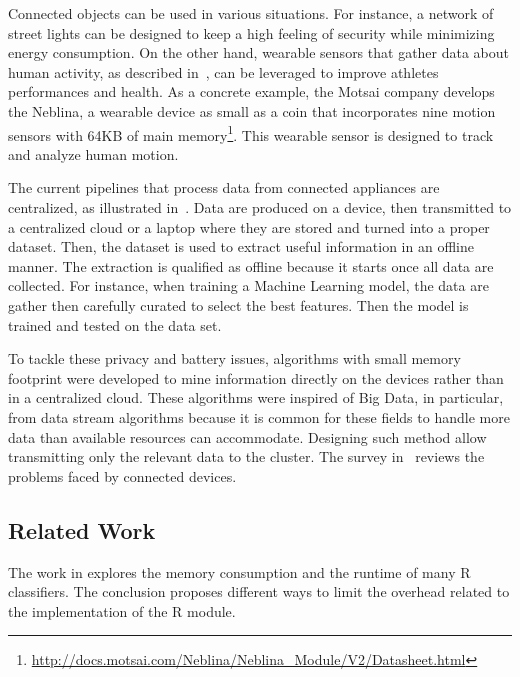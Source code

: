 Connected objects can be used in various
situations.  For instance, a network of street
lights can be designed to keep a high feeling of
security while minimizing energy consumption.  On
the other hand, wearable sensors that gather data
about human activity, as described
in~\cite{recofit}, can be leveraged to improve
athletes performances and health. 
As a concrete example, the Motsai company develops
the Neblina, a wearable device as small as a coin
that incorporates nine motion sensors with 64KB
of main
memory\footnote{\url{http://docs.motsai.com/Neblina/Neblina_Module/V2/Datasheet.html}}.
This wearable sensor is designed to track and
analyze human motion.

The current pipelines that process data from
connected appliances are centralized, as
illustrated in~\cite{recofit}.  Data are produced
on a device, then transmitted to a centralized
cloud or a laptop where they are stored and turned
into a proper dataset. Then, the dataset is used
to extract useful information in an offline
manner.  The extraction is qualified as offline
because it starts once all data are collected. For
instance, when training a Machine Learning model,
the data are gather then carefully curated to select
the best features. Then the model is trained and
tested on the data set.

To tackle these privacy and battery issues,
algorithms with small memory footprint were
developed to mine information directly on the
devices rather than in a centralized cloud.  These
algorithms were inspired of Big Data, in
particular, from data stream algorithms because it
is common for these fields to handle more data
than available resources can accommodate.
Designing such method allow transmitting only the
relevant data to the cluster. The survey
in~\cite{kejariwal2015} reviews the problems faced
by connected devices.






\subsection{Related Work}
The work in \cite{memory_consumption_machine_learning}
explores the memory consumption and
the runtime of many R classifiers. The conclusion proposes different ways to
limit the overhead related to the implementation of the R module.

